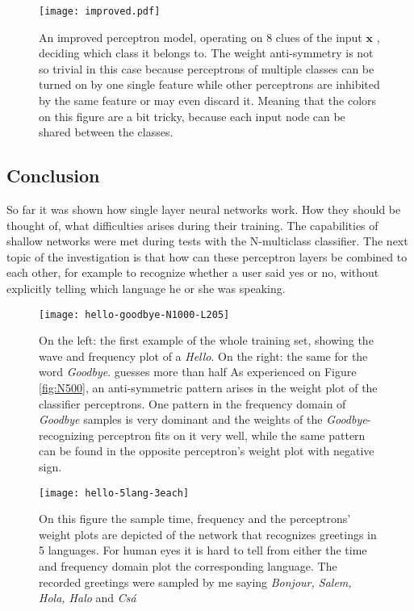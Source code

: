 \begin{figure}
	\centering
	\texttt{[image: improved.pdf]}
	\caption{An improved perceptron model, operating on 8 clues of the input $\mathbf{x}$ , deciding which class it belongs to. The weight anti-symmetry is not so trivial in this case because perceptrons of multiple classes can be turned on by one single feature while other perceptrons are inhibited by the same feature or may even discard it. Meaning that the colors on this figure are a bit tricky, because each input node can be shared between the classes.}
	
	\label{fig:improved}
\end{figure}

\subsection{Conclusion}
So far it was shown how single layer neural networks work. 
How they should be thought of, what difficulties arises during their training. 
The capabilities of shallow networks were met during tests with the N-multiclass classifier. 
The next topic of the investigation is that how can these perceptron layers be combined to each other, 
for example to recognize whether a user said yes or no, without explicitly telling  which language he or she was speaking.

\begin{figure}
	\centering
	\texttt{[image: hello-goodbye-N1000-L205]}
	\caption{On the left: the first example of the whole training set, showing the wave and frequency plot of a \emph{Hello}. On the right: the same for the word \emph{Goodbye}. guesses more than half 
	As experienced on Figure \ref{fig:N500}, an anti-symmetric pattern arises in the weight plot of the classifier perceptrons. 
	One pattern in the frequency domain of \emph{Goodbye} samples is very dominant and the weights of the \emph{Goodbye}-recognizing perceptron fits on it very well, while the same pattern can be found in the opposite perceptron's weight plot with negative sign.}
	
	\label{fig:hello}
\end{figure}

\begin{figure}
	\centering
	\texttt{[image: hello-5lang-3each]}
	\caption{On this figure the sample time, frequency and the perceptrons' weight plots are depicted of the network that recognizes greetings in 5 languages. For human eyes it is hard to tell from either the time and frequency domain plot the corresponding language. The recorded greetings were sampled by me saying \emph{Bonjour, Salem, Hola, Halo} and \emph{Csá}}
	
	\label{fig:hello5}
\end{figure}
